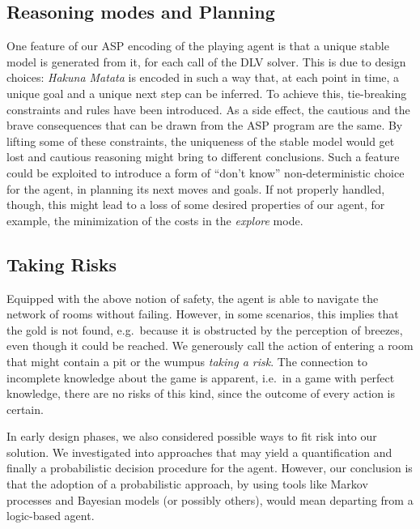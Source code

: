 \documentclass{llncs}
\newcommand{\hm}{\emph{Hakuna Matata}\xspace}
\begin{document}
\subsection{Reasoning modes and Planning}

One feature of our ASP encoding of the playing agent is that a unique stable model is generated from it, for each call of the DLV solver.
This is due to design choices: \hm is encoded in such a way that, at each point in time, a unique goal and a unique next step can be inferred.
To achieve this, tie-breaking constraints and rules have been introduced.
As a side effect, the cautious and the brave consequences that can be drawn from the ASP program are the same.
By lifting some of these constraints, the uniqueness of the stable model would get lost and cautious reasoning might bring to different conclusions.
Such a feature could be exploited to introduce a form of ``don't know'' non-deterministic choice for the agent, in planning its next moves and goals.
If not properly handled, though, this might lead to a loss of some desired properties of our agent, for example, the minimization of the costs in the \emph{explore} mode.

\subsection{Taking Risks}
Equipped with the above notion of safety, the agent is able to navigate the network of rooms without failing. However, in some scenarios, this implies that the gold is not found, e.g.\ because it is obstructed by the perception of breezes, even though it could be reached. We generously call the action of entering a room that might contain a pit or the wumpus \emph{taking a risk}. The connection to incomplete knowledge about the game is apparent, i.e.\ in a game with perfect knowledge, there are no risks of this kind, since the outcome of every action is certain.

In early design phases, we also considered possible ways to fit risk into our solution.
We investigated into approaches that may yield a quantification and finally a probabilistic decision procedure for the agent.
However, our conclusion is that the adoption of a probabilistic approach, by using tools like Markov processes and Bayesian models (or possibly others), would mean departing from a logic-based agent.
\end{document}
